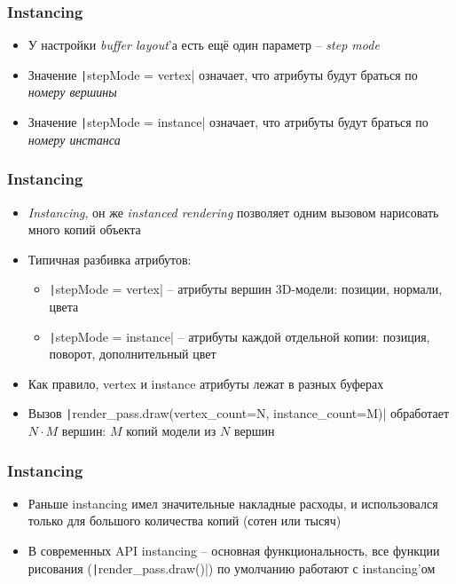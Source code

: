 \documentclass[10pt]{beamer}
\begin{document}
\begin{frame}[fragile]
\frametitle{Instancing}
\begin{itemize}
\item У настройки \textit{buffer layout}'а есть ещё один параметр -- \textit{step mode}
\pause
\item Значение \texttt|stepMode = vertex| означает, что атрибуты будут браться по \textit{номеру вершины}
\pause
\item Значение \texttt|stepMode = instance| означает, что атрибуты будут браться по \textit{номеру инстанса}
\end{itemize}
\end{frame}

\begin{frame}[fragile]
\frametitle{Instancing}
\begin{itemize}
\item \textit{Instancing}, он же \textit{instanced rendering} позволяет одним вызовом нарисовать много копий объекта
\pause
\item Типичная разбивка атрибутов:
\begin{itemize}
\item \texttt|stepMode = vertex| -- атрибуты вершин 3D-модели: позиции, нормали, цвета
\item \texttt|stepMode = instance| -- атрибуты каждой отдельной копии: позиция, поворот, дополнительный цвет
\end{itemize}
\pause
\item Как правило, vertex и instance атрибуты лежат в разных буферах
\pause
\item Вызов \texttt|render_pass.draw(vertex_count=N, instance_count=M)| обработает \(N\cdot M\) вершин: \(M\) копий модели из \(N\) вершин
\end{itemize}
\end{frame}

\begin{frame}[fragile]
\frametitle{Instancing}
\begin{itemize}
\item Раньше instancing имел значительные накладные расходы, и использовался только для большого количества копий (сотен или тысяч)
\pause
\item В современных API instancing -- основная функциональность, все функции рисования (\texttt|render_pass.draw()|) по умолчанию работают с instancing'ом
\end{itemize}
\end{frame}
\end{document}
